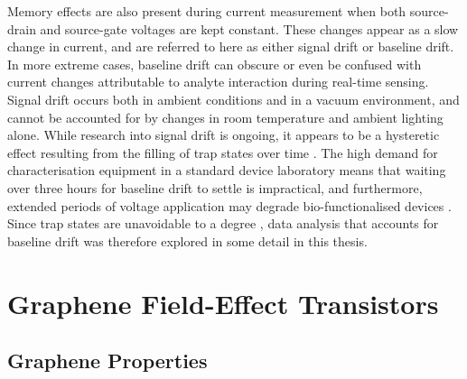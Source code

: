 \documentclass[
  a4paper,
]{scrbook}
\begin{document}
Memory effects are also present during current measurement when both
source-drain and source-gate voltages are kept constant. These changes
appear as a slow change in current, and are referred to here as either
signal drift or baseline drift. In more extreme cases, baseline drift
can obscure or even be confused with current changes attributable to
analyte interaction during real-time sensing. Signal drift occurs both
in ambient conditions and in a vacuum environment, and cannot be
accounted for by changes in room temperature and ambient lighting alone.
While research into signal drift is ongoing, it appears to be a
hysteretic effect resulting from the filling of trap states over time
\autocite{Lin2006,Noyce2019}. The high demand for characterisation
equipment in a standard device laboratory means that waiting over three
hours for baseline drift to settle is impractical, and furthermore,
extended periods of voltage application may degrade bio-functionalised
devices \autocite{Noyce2019}. Since trap states are unavoidable to a
degree \autocite{DiMaria1993,Collins2000}, data analysis that accounts
for baseline drift was therefore explored in some detail in this thesis.

\hypertarget{graphene-field-effect-transistors}{%
\section{Graphene Field-Effect
Transistors}\label{graphene-field-effect-transistors}}

\hypertarget{graphene-properties}{%
\subsection{Graphene Properties}\label{graphene-properties}}
\end{document}
